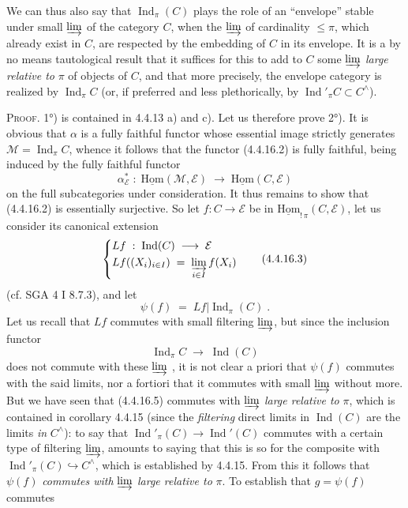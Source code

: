 \documentclass[11pt]{article}
\newcommand{\printedpage}[1]{\marginpar{\footnotesize p.~#1}}
\newcommand{\msp}[1]{\marginpar{\footnotesize [#1]}}
\newcommand{\Ind}{\operatorname{Ind}}
\newcommand{\uHom}{\underline{\mathrm{Hom}}}
\begin{document}
We can thus also say that $\Ind_\pi(C)$ plays the role of an ``envelope'' stable under small $\varinjlim$ of the category $C$, when the $\varinjlim$ of cardinality $\leqslant\pi$, which already exist in $C$, are respected by the embedding of $C$ in its envelope. It is a by no means tautological result that it suffices for this to add to $C$ some $\varinjlim$ \textit{large relative to} $\pi$ of objects of $C$, and that more precisely, the envelope category is realized by $\Ind_\pi C$ (or, if preferred and less plethorically, by $\Ind'_\pi C\subset C^\wedge$). %

\textsc{Proof}. 1°) is contained in 4.4.13 a) and c). Let us therefore prove 2°). It is obvious that $\alpha$ is a fully faithful functor whose essential image strictly generates
\printedpage{27}
$\mathcal{M}=\Ind_\pi C$, whence it follows that the functor (4.4.16.2) is fully faithful, being induced by the fully faithful functor
\[
\alpha^*_{\mathcal{E}}\;:\;\uHom(\mathcal{M},\mathcal{E})\;\longrightarrow\;\uHom(C,\mathcal{E})
\]
\msp{page 103}
on the full subcategories under consideration. It thus remains to show that (4.4.16.2) is essentially surjective. So let $f:C\longrightarrow\mathcal{E}$ be in $\uHom_{!\,\pi}(C,\mathcal{E})$, let us consider its canonical extension %
\[
\left\{
\begin{aligned}
&Lf\;:\;\Ind(C)\;\longrightarrow\;\mathcal{E}\\
&Lf((X_i)_{i\in I})\;=\;\varinjlim_{i\in I}f(X_i)
\end{aligned}
\right.
\tag*{(4.4.16.3)}
\]
(cf. SGA 4 I 8.7.3), and let
\[
\psi(f)\;=\;Lf|\Ind_\pi(C)\;. \tag*{(4.4.16.4)}
\]
Let us recall that $Lf$ commutes with small filtering $\varinjlim$, but since the inclusion functor
\[
\Ind_\pi C\;\longrightarrow\;\Ind(C) \tag*{(4.4.16.5)}
\]
does not commute with these $\varinjlim$ , it is not clear a priori that $\psi(f)$ commutes with the said limits, nor a fortiori that it commutes with small $\varinjlim$ without more. But we have seen that (4.4.16.5) commutes with $\varinjlim$ \textit{large relative to} $\pi$, which is contained in corollary 4.4.15 (since the \textit{filtering} direct limits in $\Ind(C)$ are the limits \textit{in} $C^\wedge$): to say that $\Ind'_\pi(C)\longrightarrow\Ind'(C)$ commutes with a certain type of filtering $\varinjlim$, amounts to saying that this is so for the composite with $\Ind'_\pi(C)\hookrightarrow C^\wedge$, which is established by 4.4.15. From this it follows that $\psi(f)$ \textit{commutes with} $\varinjlim$ \textit{large relative to} $\pi$. To establish that $g=\psi(f)$ commutes
\end{document}
